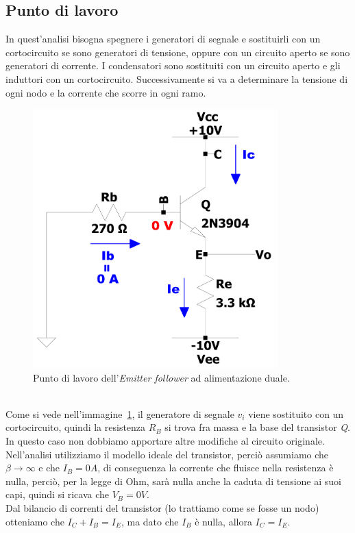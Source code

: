 \documentclass{report}
\begin{document}
\subsection{Punto di lavoro} \label{puntolavoroEFv1}
In quest'analisi bisogna spegnere i generatori di segnale e sostituirli con un cortocircuito se sono generatori di tensione, oppure con un circuito aperto se sono generatori di corrente. I condensatori sono sostituiti con un circuito aperto e gli induttori con un cortocircuito. Successivamente si va a determinare la tensione di ogni nodo e la corrente che scorre in ogni ramo. 
\begin{figure}[h]
\centering
\includegraphics[height=10cm]{immagini/EFv1_pl}
\caption{Punto di lavoro dell'\textit{Emitter follower} ad alimentazione duale.}
\label{figura:EFv1_pl}
\end{figure}
\\Come si vede nell'immagine~\ref{figura:EFv1_pl}, il generatore di segnale $v_{i}$ viene sostituito con un cortocircuito, quindi la resistenza $R_{B}$ si trova fra massa e la base del transistor \textit{Q}. In questo caso non dobbiamo apportare altre modifiche al circuito originale. 
\\Nell'analisi utilizziamo il modello ideale del transistor, perciò assumiamo che $\displaystyle{\beta\rightarrow\infty}$ e che $I_{B}=0A$, di conseguenza la corrente che fluisce nella resistenza è nulla, perciò, per la legge di Ohm, sarà nulla anche la caduta di tensione ai suoi capi, quindi si ricava che $V_{B}=0V$. 
\\Dal bilancio di correnti del  transistor (lo trattiamo come se fosse un nodo) otteniamo che $I_C+I_B=I_E$, ma dato che $I_{B}$ è nulla, allora $I_C=I_E$.
\end{document}
